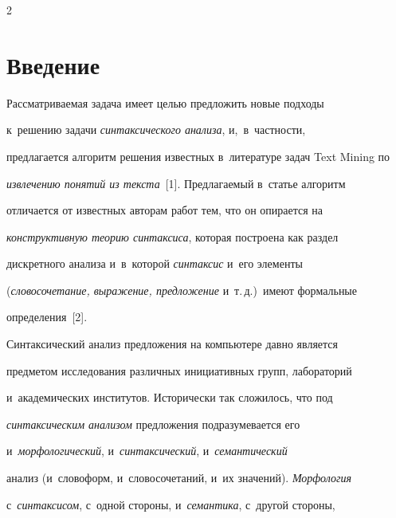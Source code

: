 \begin{multicols}{2}





\label{st\stat}


     


\section{Введение}





\vspace*{-3pt}





     Рассматриваемая задача имеет целью предложить новые подходы 


к~решению задачи \textit{синтаксического анализа}, и,~в~част\-ности, 


предлагается алгоритм решения известных в~литературе задач Text Mining по 


\textit{извлечению понятий из текста}~[1]. Предлагаемый в~статье алгоритм 


отличается от известных авторам работ тем, что он опирается на 


\textit{конструктивную тео\-рию синтаксиса}, которая построена как раздел 


дискретного анализа и~в~которой \textit{синтаксис} и~его элементы 


(\textit{словосочетание, выражение, предложение} и~т.\,д.)\ имеют формальные 


определения~[2].


     


     Синтаксический анализ предложения на компьютере давно является 


предметом исследования различных инициативных групп, лабораторий 


и~академических институтов. Исторически так сложилось, что под 


\textit{синтаксическим анализом} предложения подразумевается его 


и~\textit{морфологический}, и~\textit{синтаксический}, и~\textit{семантический} 


анализ (и~словоформ, и~словосочетаний, и~их значений). \textit{Морфология} 


с~\textit{синтаксисом}, с~одной стороны, и~\textit{семантика}, с~другой стороны, 



\end{multicols}
